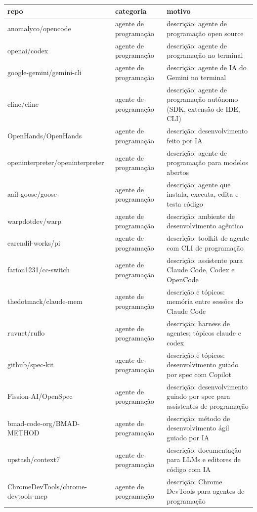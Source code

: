 \begin{tabular}{lll}
\toprule
repo & categoria & motivo \\
\midrule
anomalyco/opencode & agente de programação & descrição: agente de programação open source \\
openai/codex & agente de programação & descrição: agente de programação no terminal \\
google-gemini/gemini-cli & agente de programação & descrição: agente de IA do Gemini no terminal \\
cline/cline & agente de programação & descrição: agente de programação autônomo (SDK, extensão de IDE, CLI) \\
OpenHands/OpenHands & agente de programação & descrição: desenvolvimento feito por IA \\
openinterpreter/openinterpreter & agente de programação & descrição: agente de programação para modelos abertos \\
aaif-goose/goose & agente de programação & descrição: agente que instala, executa, edita e testa código \\
warpdotdev/warp & agente de programação & descrição: ambiente de desenvolvimento agêntico \\
earendil-works/pi & agente de programação & descrição: toolkit de agente com CLI de programação \\
farion1231/cc-switch & agente de programação & descrição: assistente para Claude Code, Codex e OpenCode \\
thedotmack/claude-mem & agente de programação & descrição e tópicos: memória entre sessões do Claude Code \\
ruvnet/ruflo & agente de programação & descrição: harness de agentes; tópicos claude e codex \\
github/spec-kit & agente de programação & descrição e tópicos: desenvolvimento guiado por spec com Copilot \\
Fission-AI/OpenSpec & agente de programação & descrição: desenvolvimento guiado por spec para assistentes de programação \\
bmad-code-org/BMAD-METHOD & agente de programação & descrição: método de desenvolvimento ágil guiado por IA \\
upstash/context7 & agente de programação & descrição: documentação para LLMs e editores de código com IA \\
ChromeDevTools/chrome-devtools-mcp & agente de programação & descrição: Chrome DevTools para agentes de programação \\

\end{tabular}
